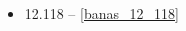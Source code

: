 \begin{multicols}{3}
\begin{itemize}
    \item 12.118 -- \ref{banas_12_118}

\end{itemize}
\end{multicols}
